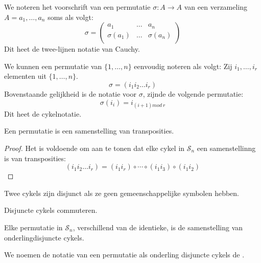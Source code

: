 \documentclass[main.tex]{subfiles}
\begin{document}
\begin{de}
  We noteren het voorschrift van een permutatie $\sigma: A\rightarrow A$ van een verzameling $A = a_{1},\dotsc,a_{n}$ soms als volgt:
  \[
  \sigma = 
  \begin{pmatrix}
    a_{1}         & \hdots & a_{n}         \\
    \sigma(a_{1}) & \hdots & \sigma(a_{n}) \\
  \end{pmatrix}
  \]
  Dit heet de twee-lijnen notatie van Cauchy.
\end{de}

\begin{de}
  We kunnen een permutatie van $\{1,\dotsc,n\}$ eenvoudig noteren als volgt:
  Zij $i_{1},\dotsc,i_{r}$ elementen uit $\{1,\dotsc,n\}$.
  \[ \sigma = (i_{1}i_{2}\dotsc i_{r}) \]
  Bovenstaande gelijkheid is de notatie voor $\sigma$, zijnde de volgende permutatie:
  \[ \sigma(i_{i}) = i_{(i+1) mod\ r} \]
  Dit heet de cykelnotatie.
\end{de}

\begin{st}
  Een permutatie is een samenstelling van transposities.

  \begin{proof}
    Het is voldoende om aan te tonen dat elke cykel in $\mathcal{S}_{n}$ een samenstellinng is van transposities:
    \[ (i_{1}i_{2}\dotsc i_{r}) = (i_{1}i_{r}) \circ \dotsb \circ (i_{1}i_{3}) \circ (i_{1}i_{2})\]
  \end{proof}
\end{st}

\begin{de}
  Twee cykels zijn disjunct als ze geen gemeenschappelijke symbolen hebben. 
\end{de}

\begin{ei}
  \label{ei:disjuncte-cykels-commuteren}
  Disjuncte cykels commuteren.
\end{ei}

\begin{st}
  Elke permutatie in $\mathcal{S}_{n}$, verschillend van de identieke, is de samenstelling van onderlingdisjuncte cykels.

\end{st}

\begin{de}
  We noemen de notatie van een permutatie als onderling disjuncte cykels de .
\end{de}
\end{document}
